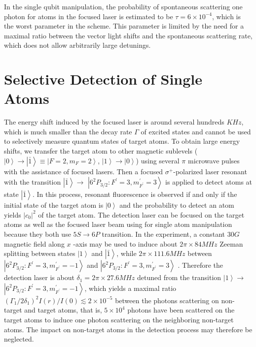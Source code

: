 \documentclass[pra,aps,showpacs,twocolumn]{revtex4}
\begin{document}
In the single qubit manipulation, the probability of spontaneous scattering
one photon for atoms in the focused laser is estimated to be $\tau =6\times
10^{-4}$, which is the worst parameter in the scheme. This parameter is
limited by the need for a maximal ratio between the vector light shifts and
the spontaneous scattering rate, which does not allow arbitrarily large
detunings.

\section{Selective Detection of Single Atoms}

The energy shift induced by the focused laser is around several hundreds $%
KHz $, which is much smaller than the decay rate $\Gamma $ of excited states
and cannot be used to selectively measure quantum states of target atoms. To
obtain large energy shifts, we transfer the target atom to other magnetic
sublevels ($\left\vert 0\right\rangle \rightarrow \left\vert \bar{1}%
\right\rangle \equiv \left\vert F=2,m_{F}=2\right\rangle $, $\left\vert
1\right\rangle \rightarrow \left\vert 0\right\rangle $) using several $\pi $
microwave pulses with the assistance of focused lasers. Then a focused $%
\sigma ^{+}$-polarized laser resonant with the transition $\left\vert \bar{1}%
\right\rangle \rightarrow $ $\left\vert 6^{2}P_{3/2}:F^{\prime
}=3,m_{F^{\prime }}^{\prime }=3\right\rangle $ is applied to detect atoms at
state $\left\vert \bar{1}\right\rangle $. In this process, resonant
fluorescence is observed if and only if the initial state of the target atom
is $\left\vert 0\right\rangle $ and the probability to detect an atom yields 
$\left\vert c_{0}\right\vert ^{2}$ of the target atom. The detection laser
can be focused on the target atoms as well as the focused laser beam using
for single atom manipulation because they both use $5S\rightarrow 6P$
transition. In the experiment, a constant $30G$ magnetic field along $x$%
-axis may be used to induce about $2\pi \times 84MHz$ Zeeman splitting
between states $\left\vert 1\right\rangle $ and $\left\vert \bar{1}%
\right\rangle $, while $2\pi \times 111.6MHz$ between $\left\vert
6^{2}P_{3/2}:F^{\prime }=3,m_{F^{\prime }}^{\prime }=-1\right\rangle $ and $%
\left\vert 6^{2}P_{3/2}:F^{\prime }=3,m_{F^{\prime }}^{\prime
}=3\right\rangle $ \cite{Metcalf}. Therefore the detection laser is about $%
\delta _{1}=2\pi \times 27.6MHz$ detuned from the transition $\left\vert
1\right\rangle \rightarrow $ $\left\vert 6^{2}P_{3/2}:F^{\prime
}=3,m_{F^{\prime }}^{\prime }=-1\right\rangle $, which yields a maximal
ratio $\left( \Gamma _{1}/2\delta _{1}\right) ^{2}I\left( r\right) /I\left(
0\right) \lesssim 2\times 10^{-5}$ \cite{Metcalf} between the photons
scattering on non-target and target atoms, that is, $5\times 10^{4}$ photons
have been scattered on the target atoms to induce one photon scattering on
the neighboring non-target atoms. The impact on non-target atoms in the
detection process may therefore be neglected.
\end{document}
